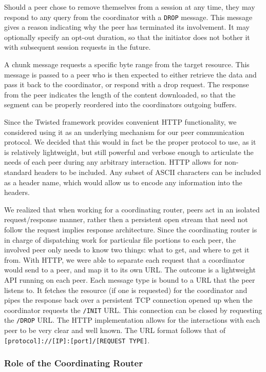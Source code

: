 \documentclass[12pt]{article}
\begin{document}
			Should a peer chose to remove themselves from a session at any time, they may respond to any query from the coordinator with a \texttt{DROP} message. This message gives a reason indicating why the peer has terminated its involvement. It may optionally specify an opt-out duration, so that the initiator does not bother it with subsequent session requests in the future.
			
			A chunk message requests a specific byte range from the target resource. This message is passed to a peer who is then expected to either retrieve the data and pass it back to the coordinator, or respond with a drop request. The response from the peer indicates the length of the content downloaded, so that the segment can be properly reordered into the coordinators outgoing buffers.

			Since the Twisted framework provides convenient HTTP functionality, we considered using it as an underlying mechanism for our peer communication protocol. We decided that this would in fact be the proper protocol to use, as it is relatively lightweight, but still powerful and verbose enough to articulate the needs of each peer during any arbitrary interaction. HTTP allows for non-standard headers to be included. Any subset of ASCII characters can be included as a header name, which would allow us to encode any information into the headers.

			We realized that when working for a coordinating router, peers act in an isolated request/response manner, rather then a persistent open stream that need not follow the request implies response architecture. Since the coordinating router is in charge of dispatching work for particular file portions to each peer, the involved peer only needs to know two things: what to get, and where to get it from. With HTTP, we were able to separate each request that a coordinator would send to a peer, and map it to its own URL. The outcome is a lightweight API running on each peer. Each message type is bound to a URL that the peer listens to. It fetches the resource (if one is requested) for the coordinator and pipes the response back over a persistent TCP connection opened up when the coordinator requests the \texttt{/INIT} URL. This connection can be closed by requesting the \texttt{/DROP} URL. The HTTP implementation allows for the interactions with each peer to be very clear and well known. The URL format follows that of \texttt{[protocol]://[IP]:[port]/[REQUEST TYPE]}.

		\subsubsection{Role of the Coordinating Router}
\end{document}
